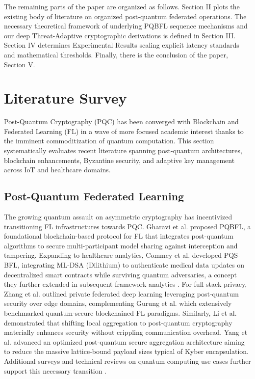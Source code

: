 \documentclass[journal, 10pt, twocolumn]{IEEEtran}
\begin{document}
The remaining parts of the paper are organized as follows. Section II plots the existing body of literature on organized post-quantum federated operations. The necessary theoretical framework of underlying PQBFL sequence mechanisms and our deep Threat-Adaptive cryptographic derivations is defined in Section III. Section IV determines Experimental Results scaling explicit latency standards and mathematical thresholds. Finally, there is the conclusion of the paper, Section V.

\section{Literature Survey}
Post-Quantum Cryptography (PQC) has been converged with Blockchain and Federated Learning (FL) in a wave of more focused academic interest thanks to the imminent commoditization of quantum computation. This section systematically evaluates recent literature spanning post-quantum architectures, blockchain enhancements, Byzantine security, and adaptive key management across IoT and healthcare domains.

\subsection{Post-Quantum Federated Learning}
The growing quantum assault on asymmetric cryptography has incentivized transitioning FL infrastructures towards PQC. Gharavi et al. \cite{gharavi2025} proposed PQBFL, a foundational blockchain-based protocol for FL that integrates post-quantum algorithms to secure multi-participant model sharing against interception and tampering. Expanding to healthcare analytics, Commey et al. \cite{commey2025_pqsbfl} developed PQS-BFL, integrating ML-DSA (Dilithium) to authenticate medical data updates on decentralized smart contracts while surviving quantum adversaries, a concept they further extended in subsequent framework analytics \cite{commey2025_health}. For full-stack privacy, Zhang et al. \cite{zhang2025} outlined private federated deep learning leveraging post-quantum security over edge domains, complementing Gurung et al. \cite{gurung2024} which extensively benchmarked quantum-secure blockchained FL paradigms. Similarly, Li et al. \cite{li2024} demonstrated that shifting local aggregation to post-quantum cryptography materially enhances security without crippling communication overhead. Yang et al. \cite{yang2023_secureagg} advanced an optimized post-quantum secure aggregation architecture aiming to reduce the massive lattice-bound payload sizes typical of Kyber encapsulation. Additional surveys and technical reviews on quantum computing use cases further support this necessary transition \cite{hlatshwayo2026, anon_pdf1}.
\end{document}
